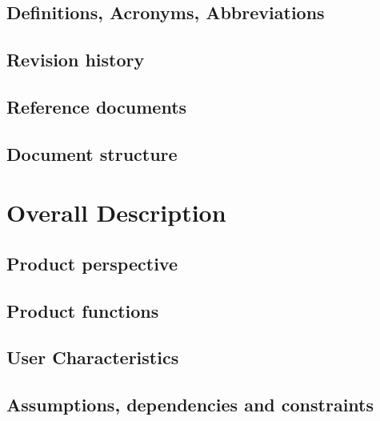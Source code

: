 \documentclass[a4paper,oneside,11pt]{article}
\begin{document}
        \subsection{Definitions, Acronyms, Abbreviations}
            
        \subsection{Revision history}
         
        \subsection{Reference documents}
            
        \subsection{Document structure}
        
        
    \newpage
    \section{Overall Description}
        \subsection{Product perspective}
            
        \subsection{Product functions}
            
        \subsection{User Characteristics}
            
        \subsection{Assumptions, dependencies and constraints}
            

    
\end{document}

